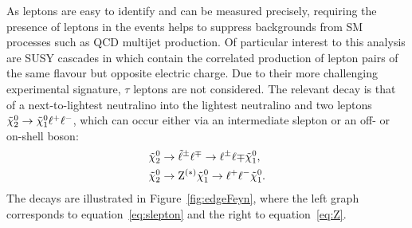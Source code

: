 As leptons are easy to identify and can be measured precisely, requiring the presence of leptons in the events helps to suppress backgrounds from SM processes such as QCD multijet production. Of particular interest to this analysis are SUSY cascades in which contain the correlated production of lepton pairs of the same flavour but opposite electric charge. Due to their more challenging experimental signature, $\tau$ leptons are not considered. The relevant decay is that of a next-to-lightest neutralino into the lightest neutralino and two leptons ${\tilde{\chi}^0_2} \rightarrow {\tilde{\chi}^0_1} \ell^+\ell^-$, which can occur either via an intermediate slepton or an off- or on-shell \Z boson:
\begin{align}
{\tilde{\chi}^0_2} &\rightarrow \tilde{\ell}^{\pm}\ell^{\mp} \rightarrow \ell^{\pm}\ell{\mp}{\tilde{\chi}^0_1},\label{eq:slepton}\\ 
{\tilde{\chi}^0_2} &\rightarrow \mathrm{Z}^{(*)}{\tilde{\chi}^0_1} \rightarrow \ell^+\ell^-{\tilde{\chi}^0_1}.\label{eq:Z}
\end{align}
The decays are illustrated in Figure~\ref{fig:edgeFeyn}, where the left graph corresponds to equation~\ref{eq:slepton} and the right to equation~\ref{eq:Z}.
